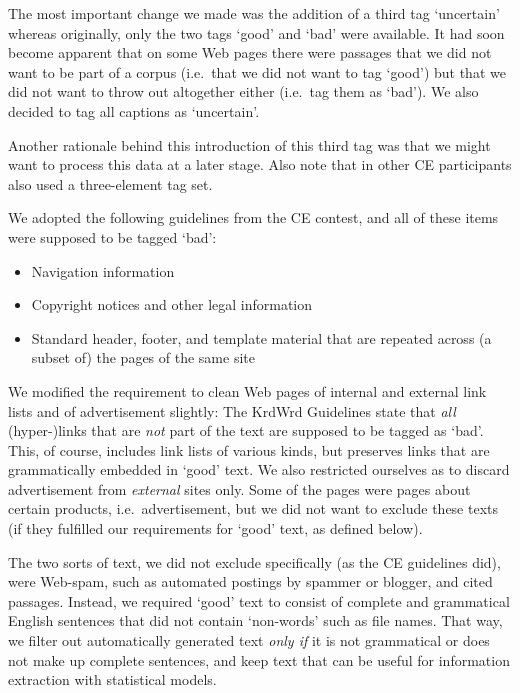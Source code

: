 \begin{longversion}
The most important change we made was the addition of a third tag `uncertain' whereas originally, only the two tags `good' and `bad' were available.
It had soon become apparent that on some Web pages there were passages that we did not want to be part of a corpus (i.e.~that we did not want to tag `good') but that we did not want to throw out altogether either (i.e.~tag them as `bad'). 
We also decided to tag all captions as `uncertain'. 

Another rationale behind this introduction of this third tag was that we might want to process this data at a later stage.
Also note that in \cite{SpoustaMarekPecina2008} other CE participants also used a three-element tag set.

We adopted the following guidelines from the CE contest, and all of these items were supposed to be tagged `bad':

\begin{itemize}
        \item Navigation information
        \item Copyright notices and other legal information
        \item Standard header, footer, and template material that are repeated across (a subset of) the pages of the same site
\end{itemize}

We modified the requirement to clean Web pages of internal and external link lists and of advertisement slightly: 
The KrdWrd Guidelines state that \textit{all} \mbox{(hyper-)links} that are \textit{not} part of the text are supposed to be tagged as `bad'. 
This, of course, includes link lists of various kinds, but preserves links that are grammatically embedded in `good' text. 
We also restricted ourselves as to discard advertisement from \textit{external} sites only. 
Some of the pages were pages about certain products, i.e.~advertisement, but we did not want to exclude these texts (if they fulfilled our requirements for `good' text, as defined below).  

The two sorts of text, we did not exclude specifically (as the CE guidelines did), were Web-spam, such as automated postings by spammer or blogger, and cited passages. 
Instead, we required `good' text to consist of complete and grammatical English sentences that did not contain `non-words' such as file names. 
That way, we filter out automatically generated text \textit{only if} it is not grammatical or does not make up complete sentences, and keep text that can be useful for information extraction with statistical models.


\end{longversion}

